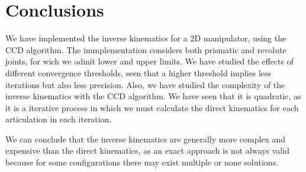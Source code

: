 \section{Conclusions}
We have implemented the inverse kinematics for a 2D manipulator, using the CCD algorithm. The immplementation considers both prismatic and revolute joints, for wich we admit lower and upper limits.
We have studied the effects of different convergence thresholds, seen that a higher threshold implies less iterations but also less precision.
Also, we have studied the complexity of the inverse kinematics with the CCD algorithm. We have seen that it is quadratic, as it is a iterative process in which we must calculate the direct kinematics for each articulation in each iteration.

\bigskip We can conclude that the inverse kinematics are generally more complex and expensive than the direct kinematics, as an exact approach is not always valid because for some configurations there may exist multiple or none solutions. 

